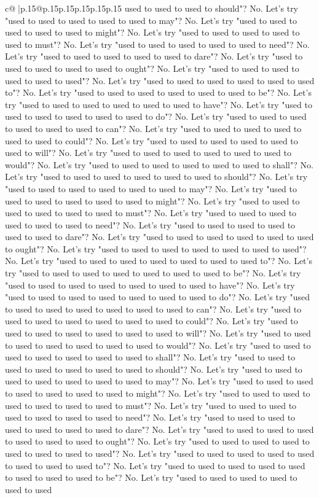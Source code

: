 \documentclass{article}
\begin{document}
{\begin{supertabular}{c@{$\;$}|p{.15\linewidth}@{}p{.15\linewidth}p{.15\linewidth}p{.15\linewidth}p{.15\linewidth}p{.15\linewidth}}
{{{used to used to used to should"? No. Let's try "used to used to used to used to used to may"? No. Let's try "used to used to used to used to used to might"? No. Let's try "used to used to used to used to used to must"? No. Let's try "used to used to used to used to used to need"? No. Let's try "used to used to used to used to used to dare"? No. Let's try "used to used to used to used to used to ought"? No. Let's try "used to used to used to used to used to used"? No. Let's try "used to used to used to used to used to used to"? No. Let's try "used to used to used to used to used to used to be"? No. Let's try "used to used to used to used to used to used to have"? No. Let's try "used to used to used to used to used to used to do"? No. Let's try "used to used to used to used to used to used to can"? No. Let's try "used to used to used to used to used to used to could"? No. Let's try "used to used to used to used to used to used to will"? No. Let's try "used to used to used to used to used to used to would"? No. Let's try "used to used to used to used to used to used to shall"? No. Let's try "used to used to used to used to used to used to should"? No. Let's try "used to used to used to used to used to used to may"? No. Let's try "used to used to used to used to used to used to might"? No. Let's try "used to used to used to used to used to used to must"? No. Let's try "used to used to used to used to used to used to need"? No. Let's try "used to used to used to used to used to used to dare"? No. Let's try "used to used to used to used to used to used to ought"? No. Let's try "used to used to used to used to used to used to used"? No. Let's try "used to used to used to used to used to used to used to"? No. Let's try "used to used to used to used to used to used to used to be"? No. Let's try "used to used to used to used to used to used to used to have"? No. Let's try "used to used to used to used to used to used to used to do"? No. Let's try "used to used to used to used to used to used to used to can"? No. Let's try "used to used to used to used to used to used to used to could"? No. Let's try "used to used to used to used to used to used to used to will"? No. Let's try "used to used to used to used to used to used to used to would"? No. Let's try "used to used to used to used to used to used to used to shall"? No. Let's try "used to used to used to used to used to used to used to should"? No. Let's try "used to used to used to used to used to used to used to may"? No. Let's try "used to used to used to used to used to used to used to might"? No. Let's try "used to used to used to used to used to used to used to must"? No. Let's try "used to used to used to used to used to used to used to need"? No. Let's try "used to used to used to used to used to used to used to dare"? No. Let's try "used to used to used to used to used to used to used to ought"? No. Let's try "used to used to used to used to used to used to used to used"? No. Let's try "used to used to used to used to used to used to used to used to"? No. Let's try "used to used to used to used to used to used to used to used to be"? No. Let's try "used to used to used to used to used to used }}}
\end{supertabular}}
\end{document}
